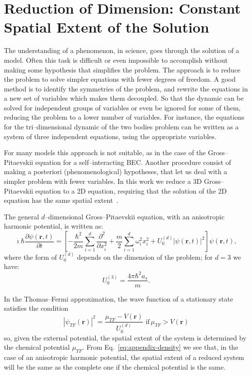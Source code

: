 \chapter{Reduction of Dimension: Constant Spatial Extent of the Solution}
 \label{App:A}
The understanding of a phenomenon, in science, goes through the solution of a model. Often this task is difficult or even impossible to accomplish without making some hypothesis that simplifies the problem. The approach is to reduce the problem to solve simpler equations with fewer degrees of freedom. A good method is to identify the symmetries of the problem, and rewrite the equations in a new set of variables which makes them decoupled. So that the dynamic can be solved for independent groups of variables or even be ignored for some of them, reducing the problem to a lower number of variables. For instance, the equations for the tri--dimensional dynamic of the two bodies problem can be written as a system of three independent equations, using the appropriate variables.

For many models this approach is not suitable, as in the case of the Gross--Pitaevskii equation for a self--interacting BEC. Another procedure consist of making a posteriori (phenomenological) hypotheses, that let us deal with a simpler problem with fewer variables. In this work we reduce a 3D Gross--Pitaevskii equation to a 2D equation, requiring that the solution of the 2D equation has the same spatial extent~\citep{PietroMassignan}.

The general $d$--dimensional Gross--Pitaevskii equation, with an anisotropic harmonic potential, is written as:
\begin{equation}
\imath \hbar \frac{\partial \psi(\textbf{r}, t)}{\partial t} = \left[ - \frac{\hbar^2}{2m} \sum_{i=1}^d \frac{\partial^2}{\partial x_i^2} + \frac{m}{2} \sum_{i=1}^d \omega_i^2 x_i^2 + U_0^{(d)} |\psi(\textbf{r}, t)|^2 \right] \psi(\textbf{r}, t),
\end{equation}
where the form of $U_0^{(d)}$ depends on the dimension of the problem; for $d=3$ we have:
\begin{equation}
U_0^{(3)} = \frac{4\pi \hbar^2 a_s}{m}.
\end{equation}

In the Thomas--Fermi approximation, the wave function of a stationary state satisfies the condition
\begin{equation} \label{eq:appendix-density}
|\psi_{TF}(\textbf{r})|^2 = \frac{\mu_{TF} - V(\textbf{r})}{U_0^{(d)}} \,\, \mathrm{if} \, \mu_{TF}  > V(\textbf{r})
\end{equation}
so, given the external potential, the spatial extent of the system is determined by the chemical potential $\mu_{TF}$. From Eq.~\eqref{eq:appendix-density} we see that, in the case of an anisotropic harmonic potential, the spatial extent of a reduced system will be the same as the complete one if the chemical potential is the same.

